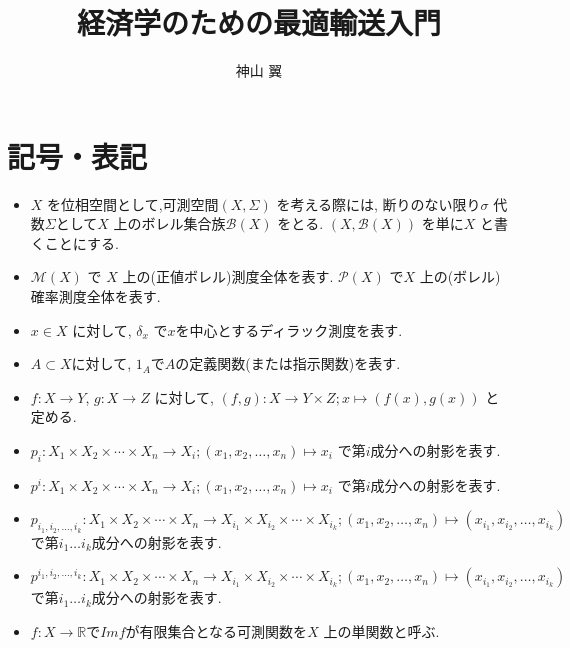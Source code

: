 \documentclass[10pt, fleqn, label-section=none, titlepage]{bxjsarticle}
\title{経済学のための最適輸送入門}
\date{}
\author{神山 翼}
\theoremstyle{definition}
\renewcommand{\;}{\, ; \,}
\begin{document}
\maketitle

\newpage
\tableofcontents
\newpage

\section{記号・表記}

\begin{itemize}

\item $X$ を位相空間として,可測空間$(X, Σ)$ を考える際には, 断りのない限り$\sigma$ 代数$\Sigma$として$X$ 上のボレル集合族$\mathcal{B}(X)$ をとる.
$(X, \mathcal{B}(X))$ を単に$X$ と書くことにする.
\item $\mathcal{M}(X)$ で $X$ 上の(正値ボレル)測度全体を表す. $\mathcal{P}(X)$ で$X$ 上の(ボレル)確率測度全体を表す.
\item $x \in  X$ に対して, $\delta_{x}$ で$x$を中心とするディラック測度を表す.
\item $A \subset X$に対して, $1_{A}$で$A$の定義関数(または指示関数)を表す.
\item $f:X \rightarrow Y$, $g:X\rightarrow Z$ に対して, $(f,g):X \rightarrow Y \times Z ; x \mapsto (f(x), g(x))$ と定める.
\item $p_{i} : X_{1} \times X_{2} \times \cdots \times X_{n} \rightarrow X_{i} ; (x_{1}, x_{2}, \ldots , x_{n}) \mapsto x_{i}$ で第$i$成分への射影を表す.
\item $p^{i} : X_{1} \times X_{2} \times \cdots \times X_{n} \rightarrow X_{i} ; (x_{1}, x_{2}, \ldots , x_{n}) \mapsto x_{i}$ で第$i$成分への射影を表す. 
\item $p_{i_{1}, i_{2}, \ldots, i_{k} } : X_{1} \times X_{2} \times \cdots \times X_{n} \rightarrow X_{i_{1}} \times X_{i_{2}} \times \cdots \times X_{i_{k}} ; (x_{1}, x_{2}, \ldots , x_{n}) \mapsto (x_{i_{1}}, x_{i_{2}}, \ldots, x_{i_{k}})$ で第$i_1 \ldots i_k$成分への射影を表す.
\item $p^{i_{1}, i_{2}, \ldots, i_{k} }: X_{1} \times X_{2} \times \cdots \times X_{n} \rightarrow X_{i_{1}} \times X_{i_{2}} \times \cdots \times X_{i_{k}} ; (x_{1}, x_{2}, \ldots , x_{n}) \mapsto (x_{i_{1}}, x_{i_{2}}, \ldots, x_{i_{k}})$ で第$i_1 \ldots i_k$成分への射影を表す.
\item $f:X \rightarrow \mathbb{R}$で$Imf$が有限集合となる可測関数を$X$ 上の単関数と呼ぶ.

\end{itemize}
\end{document}

